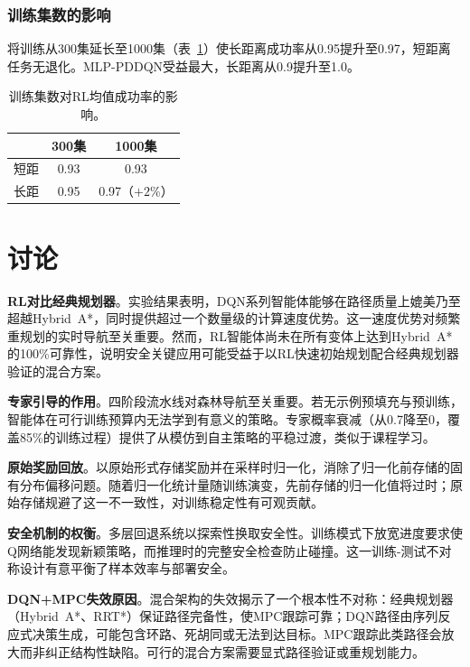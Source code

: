 \documentclass[conference]{IEEEtran}
\begin{document}
\subsubsection{训练集数的影响}

将训练从300集延长至1000集（表~\ref{tab:ablation_episodes}）使长距离成功率从0.95提升至0.97，短距离任务无退化。MLP-PDDQN受益最大，长距离从0.9提升至1.0。

\begin{table}[t]
\centering
\caption{训练集数对RL均值成功率的影响。}
\label{tab:ablation_episodes}
\footnotesize
\begin{tabular}{@{}lcc@{}}
\toprule
& \textbf{300集} & \textbf{1000集} \\
\midrule
短距 & 0.93 & 0.93 \\
长距 & 0.95 & 0.97（$+2\%$）\\
\bottomrule
\end{tabular}
\end{table}

\section{讨论}\label{sec:discussion}

\textbf{RL对比经典规划器}。实验结果表明，DQN系列智能体能够在路径质量上媲美乃至超越Hybrid~A*，同时提供超过一个数量级的计算速度优势。这一速度优势对频繁重规划的实时导航至关重要。然而，RL智能体尚未在所有变体上达到Hybrid~A*的100\%可靠性，说明安全关键应用可能受益于以RL快速初始规划配合经典规划器验证的混合方案。

\textbf{专家引导的作用}。四阶段流水线对森林导航至关重要。若无示例预填充与预训练，智能体在可行训练预算内无法学到有意义的策略。专家概率衰减（从0.7降至0，覆盖85\%的训练过程）提供了从模仿到自主策略的平稳过渡，类似于课程学习。

\textbf{原始奖励回放}。以原始形式存储奖励并在采样时归一化，消除了归一化前存储的固有分布偏移问题。随着归一化统计量随训练演变，先前存储的归一化值将过时；原始存储规避了这一不一致性，对训练稳定性有可观贡献。

\textbf{安全机制的权衡}。多层回退系统以探索性换取安全性。训练模式下放宽进度要求使Q网络能发现新颖策略，而推理时的完整安全检查防止碰撞。这一训练-测试不对称设计有意平衡了样本效率与部署安全。

\textbf{DQN+MPC失效原因}。混合架构的失效揭示了一个根本性不对称：经典规划器（Hybrid~A*、RRT*）保证路径完备性，使MPC跟踪可靠；DQN路径由序列反应式决策生成，可能包含环路、死胡同或无法到达目标。MPC跟踪此类路径会放大而非纠正结构性缺陷。可行的混合方案需要显式路径验证或重规划能力。
\end{document}
